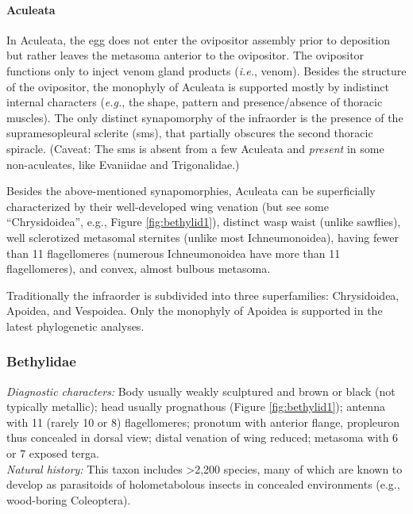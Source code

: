 \documentclass[letterpaper, 11pt]{article}
\begin{document}
\paragraph*{Aculeata} In Aculeata, the egg does not enter the ovipositor assembly prior to deposition but rather leaves the metasoma anterior to the ovipositor. The ovipositor functions only to inject venom gland products (\textit{i.e.}, venom). Besides the structure of the ovipositor, the monophyly of Aculeata is supported mostly by indistinct internal characters (\textit{e.g.}, the shape, pattern and presence/absence of thoracic muscles). The only distinct synapomorphy of the infraorder is the presence of the supramesopleural sclerite (sms), that partially obscures the second thoracic spiracle. (Caveat: The sms is absent from a few Aculeata and \textit{present} in some non-aculeates, like Evaniidae and Trigonalidae.)

Besides the above-mentioned synapomorphies, Aculeata can be superficially characterized by their well-developed wing venation (but see some ``Chrysidoidea'', e.g., Figure \ref{fig:bethylid1}), distinct wasp waist (unlike sawflies), well sclerotized metasomal sternites (unlike most Ichneumonoidea), having fewer than 11 flagellomeres (numerous Ichneumonoidea have more than 11 flagellomeres), and convex, almost bulbous metasoma.

Traditionally the infraorder is subdivided into three superfamilies: Chrysidoidea, Apoidea, and Vespoidea. Only the monophyly of Apoidea is supported in the latest phylogenetic analyses.

\subsubsection{Bethylidae}
\noindent{}\textit{Diagnostic characters:} Body usually weakly sculptured and brown or black (not typically metallic); head usually prognathous (Figure \ref{fig:bethylid1}); antenna with 11 (rarely 10 or 8) flagellomeres; pronotum with anterior flange, propleuron thus concealed in dorsal view; distal venation of wing reduced; metasoma with 6 or 7 exposed terga. \\

\noindent{}\textit{Natural history:} This taxon includes \textgreater2,200 species, many of which are known to develop as parasitoids of holometabolous insects in concealed environments (e.g., wood-boring Coleoptera).\\
\end{document}
